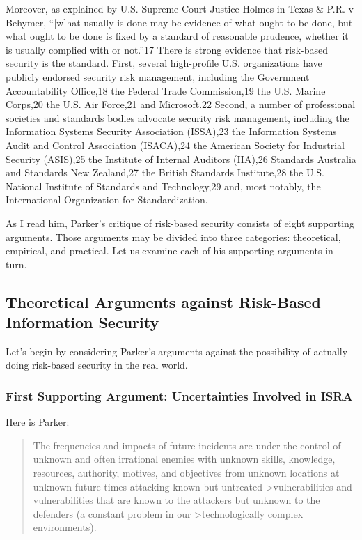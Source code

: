 Moreover, as explained by U.S. Supreme Court Justice Holmes in Texas \&
P.R. v Behymer, ``{[}w{]}hat usually is done may be evidence of what
ought to be done, but what ought to be done is fixed by a standard of
reasonable prudence, whether it is usually complied with or not.''17
There is strong evidence that risk-based security is the standard.
First, several high-profile U.S. organizations have publicly endorsed
security risk management, including the Government Accountability
Office,18 the Federal Trade Commission,19 the U.S. Marine Corps,20 the
U.S. Air Force,21 and Microsoft.22 Second, a number of professional
societies and standards bodies advocate security risk management,
including the Information Systems Security Association (ISSA),23 the
Information Systems Audit and Control Association (ISACA),24 the
American Society for Industrial Security (ASIS),25 the Institute of
Internal Auditors (IIA),26 Standards Australia and Standards New
Zealand,27 the British Standards Institute,28 the U.S. National
Institute of Standards and Technology,29 and, most notably, the
International Organization for Standardization.

As I read him, Parker's critique of risk-based security consists of
eight supporting arguments. Those arguments may be divided into three
categories: theoretical, empirical, and practical. Let us examine each
of his supporting arguments in turn.

\subsection{Theoretical Arguments against Risk-Based Information
Security}\label{theoretical-arguments-against-risk-based-information-security}

Let's begin by considering Parker's arguments against the possibility of
actually doing risk-based security in the real world.

\subsubsection{First Supporting Argument: Uncertainties Involved in
ISRA}\label{first-supporting-argument-uncertainties-involved-in-isra}

Here is Parker:

\begin{quote}
The frequencies and impacts of future incidents are under the control of
unknown and often irrational enemies with unknown skills, knowledge,
resources, authority, motives, and objectives from unknown locations at
unknown future times attacking known but untreated
\textgreater{}vulnerabilities and vulnerabilities that are known to the
attackers but unknown to the defenders (a constant problem in our
\textgreater{}technologically complex environments).
\end{quote}

